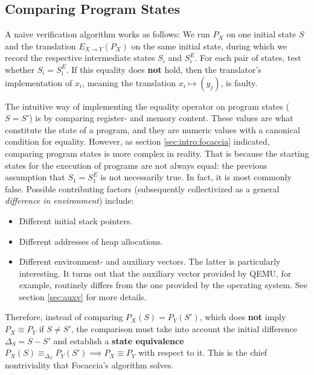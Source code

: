 \subsection{Comparing Program States}\label{sec:comparison}

A naive verification algorithm works as follows: We run $P_X$ on one initial state $S$ and the translation $E_{X
\rightarrow Y}(P_X)$ on the same initial state, during which we record the respective intermediate states $S_i$ and
$S^E_i$. For each pair of states, test whether $S_i = S^E_i$. If this equality does \textbf{not} hold, then the
translator's implementation of $x_i$, meaning the translation $x_i \mapsto (y_j)$, is faulty.

The intuitive way of implementing the equality operator on program states ($S = S'$) is by comparing register- and
memory content. These values are what constitute the state of a program, and they are numeric values with a canonical
condition for equality. However, as section \ref{sec:intro:focaccia} indicated, comparing program states is more complex
in reality. That is because the starting states for the execution of programs are not always equal: the previous
assumption that $S_1 = S^E_1$ is not necessarily true. In fact, it is most commonly false. Possible contributing factors
(subsequently collectivized as a general \textit{difference in environment}) include:

\begin{itemize}
    \item Different initial stack pointers.
    \item Different addresses of heap allocations.
    \item Different environment- and auxiliary vectors. The latter is particularly interesting. It turns out that
        the auxiliary vector provided by QEMU, for example, routinely differs from the one provided by the operating
        system. See section \ref{sec:auxv} for more details.
\end{itemize}

Therefore, instead of comparing $P_X(S) = P_Y(S')$, which does \textbf{not} imply $P_X \equiv P_Y$ if $S \neq S'$, the
comparison must take into account the initial difference $\Delta_S = S - S'$ and establish a \textbf{state equivalence}
$P_X(S) \equiv_{\Delta_S} P_Y(S') \implies P_X \equiv P_Y$ with respect to it. This is the chief nontriviality that
Focaccia's algorithm solves.


